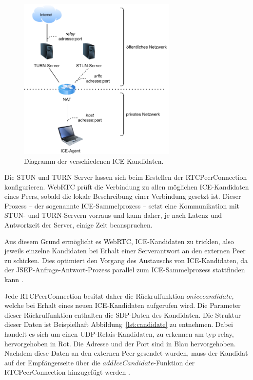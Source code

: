 \begin{figure}[h]
\centering
\includegraphics[width=0.70\textwidth]{bilder/PDF_SVG/CANDIDATES.pdf}
\caption{Diagramm der verschiedenen \acs{ICE}-Kandidaten.}
\label{fig:icecandidates}
\end{figure}

Die \acs{STUN} und \acs{TURN} Server lassen sich beim Erstellen der RTCPeerConnection konfigurieren. \acs{WebRTC} prüft die Verbindung zu allen möglichen \acs{ICE}-Kandidaten eines Peers, sobald die lokale Beschreibung einer Verbindung gesetzt ist. Dieser Prozess -- der sogenannte \glqq{}\acs{ICE}-Sammelprozess\grqq{} -- setzt eine Kommunikation mit \acs{STUN}- und \acs{TURN}-Servern vorraus und kann daher, je nach Latenz und Antwortzeit der Server, einige Zeit beanspruchen.\par

Aus diesem Grund ermöglicht es \acs{WebRTC}, \acs{ICE}-Kandidaten zu \glqq{}tricklen\grqq{}, also jeweils einzelne Kandidaten bei Erhalt einer Serverantwort an den externen Peer zu schicken. Dies optimiert den Vorgang des Austauschs von \acs{ICE}-Kandidaten, da der \acs{JSEP}-Anfrage-Antwort-Prozess parallel zum \acs{ICE}-Sammelprozess stattfinden kann \cite{rtctrickleice}.\par

Jede RTCPeerConnection besitzt daher die Rückruffunktion \glqq{}$onicecandidate$\grqq{}, welche bei Erhalt eines neuen \acs{ICE}-Kandidaten aufgerufen wird. Die Parameter dieser Rückruffunktion enthalten die \acs{SDP}-Daten des Kandidaten. Die Struktur dieser Daten ist Beispielhaft Abbildung~\ref{lst:candidate} zu entnehmen. Dabei handelt es sich um einen \acs{UDP}-Relais-Kandidaten, zu erkennen am \glqq{}typ relay\grqq{}, hervorgehoben in Rot. Die Adresse und der Port sind in Blau hervorgehoben. Nachdem diese Daten an den externen Peer gesendet wurden, muss der Kandidat auf der Empfängerseite über die $addIceCandidate$-Funktion der RTCPeerConnection hinzugefügt werden \cite{rtcconnectivity}.


